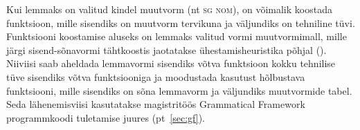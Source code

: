 \documentclass[12pt,a4paper]{article}
\newcommand{\vadja}[1]{\textit{#1}}
\newcommand{\msd}[1]{\textsc{#1}}
\begin{document}
Kui lemmaks on valitud kindel muutvorm (nt \msd{sg nom}), on võimalik koostada funktsioon, mille sisendiks on muutvorm tervikuna ja väljundiks on tehniline tüvi. Funktsiooni koostamise aluseks on lemmaks valitud vormi muutvormi\-mall, mille järgi sisend-sõnavormi tähtkoostis jaotatakse ühestamisheuristika põhjal (\cite[572]{ahlberg_semi-supervised_2014}). Niiviisi saab aheldada lemmavormi sisendiks võtva funktsioon kokku tehnilise tüve sisendiks võtva funktsiooniga ja moodustada kasutust hõlbustava funktsiooni, mille sisendiks on sõna lemmavorm ja väljundiks muutvormide tabel. Seda lähenemisviisi kasutatakse magistritöös Grammatical Framework programmkoodi tuletamise juures (pt~\ref{sec:gf}). %


%
%
%
%
%
%
\end{document}

